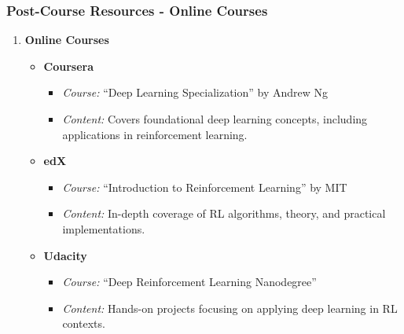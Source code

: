 \documentclass[aspectratio=169]{beamer}
\begin{document}
\begin{frame}[fragile]
    \frametitle{Post-Course Resources - Online Courses}
    \begin{enumerate}
        \item \textbf{Online Courses}
        \begin{itemize}
            \item \textbf{Coursera}
                \begin{itemize}
                    \item \textit{Course:} ``Deep Learning Specialization'' by Andrew Ng
                    \item \textit{Content:} Covers foundational deep learning concepts, including applications in reinforcement learning.
                \end{itemize}
            \item \textbf{edX}
                \begin{itemize}
                    \item \textit{Course:} ``Introduction to Reinforcement Learning'' by MIT
                    \item \textit{Content:} In-depth coverage of RL algorithms, theory, and practical implementations.
                \end{itemize}
            \item \textbf{Udacity}
                \begin{itemize}
                    \item \textit{Course:} ``Deep Reinforcement Learning Nanodegree''
                    \item \textit{Content:} Hands-on projects focusing on applying deep learning in RL contexts.
                \end{itemize}
        \end{itemize}
    \end{enumerate}
\end{frame}
\end{document}
